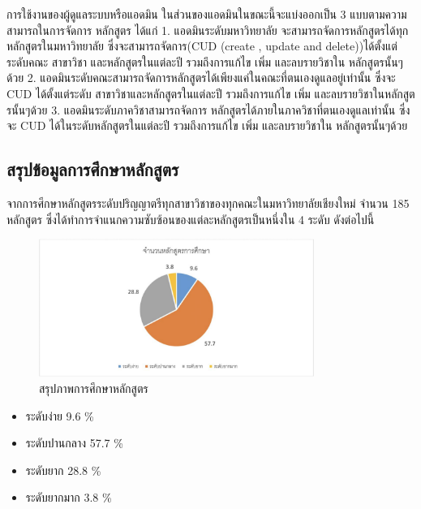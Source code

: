 การใช้งานของผู้ดูแลระบบหรือแอดมิน ในส่วนของแอดมินในขณะนี้จะแบ่งออกเป็น 3 แบบตามความสามารถในการจัดการ
หลักสูตร ได้แก่ 1. แอดมินระดับมหาวิทยาลัย จะสามารถจัดการหลักสูตรได้ทุกหลักสูตรในมหาวิทยาลัย ซึ่งจะสามารถจัดการ(CUD
(create , update and delete))ได้ตั้งแต่ระดับคณะ สาขาวิชา และหลักสูตรในแต่ละปี รวมถึงการแก้ไข เพิ่ม และลบรายวิชาใน
หลักสูตรนั้นๆด้วย 2. แอดมินระดับคณะสามารถจัดการหลักสูตรได้เพียงแค่ในคณะที่ตนเองดูแลอยู่เท่านั้น ซึ่งจะ CUD ได้ตั้งแต่ระดับ
สาขาวิชาและหลักสูตรในแต่ละปี รวมถึงการแก้ไข เพิ่ม และลบรายวิชาในหลักสูตรนั้นๆด้วย 3. แอดมินระดับภาควิชาสามารถจัดการ
หลักสูตรได้ภายในภาควิชาที่ตนเองดูแลเท่านั้น ซึ่งจะ CUD ได้ในระดับหลักสูตรในแต่ละปี รวมถึงการแก้ไข เพิ่ม และลบรายวิชาใน
หลักสูตรนั้นๆด้วย

\subsection{สรุปข้อมูลการศึกษาหลักสูตร}

\begin{center}
  จากการศีกษาหลักสูตรระดับปริญญาตรีทุกสาขาวิชาของทุกคณะในมหาวิทยาลัยเชียงใหม่ จํานวน 185 หลักสูตร ซึ่งได้ทําการจําแนกความซับซ้อนของแต่ละหลักสูตรเป็นหนึ่งใน 4 ระดับ ดังต่อไปนี้
\end{center}

\begin{figure}[H]
  \begin{center}
    \includegraphics[width=0.8\textwidth]{chart.png}
    \caption{สรุปภาพการศึกษาหลักสูตร}
    \label{fig:chart}
  \end{center}
\end{figure}

\begin{center}
  \begin{minipage}[c]{0.5\linewidth}
     \begin{itemize}
       \item ระดับง่าย 9.6 \%
       \item ระดับปานกลาง 57.7 \%
       \item ระดับยาก 28.8 \%
       \item ระดับยากมาก 3.8 \%
     \end{itemize}
  \end{minipage}
\end{center}

